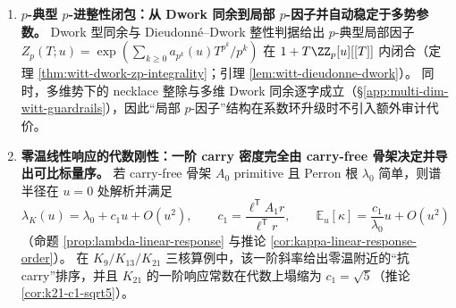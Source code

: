 \begin{enumerate}
  \item \textbf{\texorpdfstring{$p$}{p}-典型 \texorpdfstring{$p$}{p}-进整性闭包：从 Dwork 同余到局部 \texorpdfstring{$p$}{p}-因子并自动稳定于多势参数。}
  Dwork 型同余与 Dieudonn\'e--Dwork 整性判据给出 \(p\)-典型局部因子
  \(
  Z_p(T;u)=\exp(\sum_{k\ge 0}a_{p^k}(u)T^{p^k}/p^k)
  \)
  在 \(1+T\ZZ_p[u][[T]]\) 内闭合（定理 \ref{thm:witt-dwork-zp-integrality}；引理 \ref{lem:witt-dieudonne-dwork}）。
  同时，多维势下的 necklace 整除与多维 Dwork 同余逐字成立（\S\ref{app:multi-dim-witt-guardrails}），因此“局部 \(p\)-因子”结构在系数环升级时不引入额外审计代价。

  \item \textbf{零温线性响应的代数刚性：一阶 carry 密度完全由 carry-free 骨架决定并导出可比标量序。}
  若 carry-free 骨架 \(A_0\) primitive 且 Perron 根 \(\lambda_0\) 简单，则谱半径在 \(u=0\) 处解析并满足
  \[
  \lambda_K(u)=\lambda_0+c_1u+O(u^2),
  \qquad
  c_1=\frac{\ell^{\mathsf T}A_1 r}{\ell^{\mathsf T}r},
  \qquad
  \mathbb{E}_u[\kappa]=\frac{c_1}{\lambda_0}u+O(u^2)
  \]
  （命题 \ref{prop:lambda-linear-response} 与推论 \ref{cor:kappa-linear-response-order}）。
  在 \(K_9/K_{13}/K_{21}\) 三核算例中，该一阶斜率给出零温附近的“抗 carry”排序，并且 \(K_{21}\) 的一阶响应常数在代数上塌缩为 \(c_1=\sqrt5\)（推论 \ref{cor:k21-c1-sqrt5}）。
\end{enumerate}

